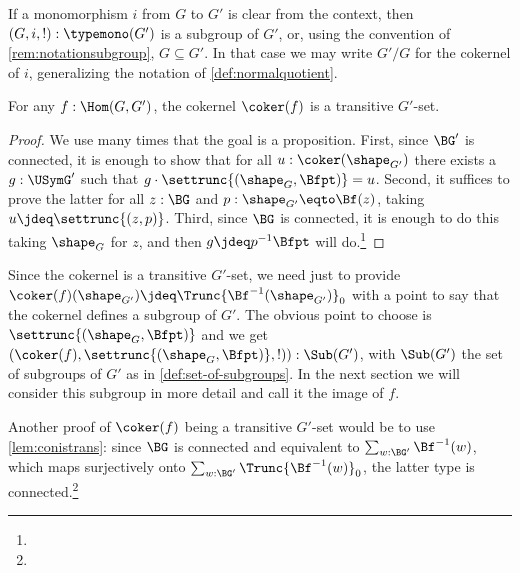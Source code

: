 If a monomorphism $i$ from $G$ to $G'$ is clear from the context,
then $(G,i,!):\typemono(G')$ is a subgroup of $G'$, 
or, using the convention of \cref{rem:notationsubgroup}, $G\subseteq G'$. 
In that case we may write $G'/G$ for the cokernel of $i$,
generalizing the notation of \cref{def:normalquotient}.
\begin{lemma}
  \label{lem:isTrans(coker)}
  For any $f:\Hom(G,G')$, the cokernel $\coker(f)$ is a transitive $G'$-set.
\end{lemma}
\begin{proof}
We use many times that the goal is a proposition.
First, since $\BG'$ is connected, it is enough to show that for all 
$u:\coker(\sh_{G'})$ there exists
a $g:\USymG'$ such that $g\cdot\settrunc{(\sh_G,\Bfpt)}=u$.
Second, it suffices to prove the latter for all $z:\BG$ and 
$p:\sh_{G'}\eqto\Bf(z)$, taking $u\jdeq\settrunc{(z,p)}$.  
Third, since $\BG$ is connected, it is enough to do this taking $\sh_G$ 
for $z$, and then $g\jdeq p^{-1} \Bfpt$ will do.\footnote{%
 }
\end{proof}   
\begin{remark}
  \label{rem:imageandcokernel}
  Since the cokernel is a transitive $G'$-set, we need just to 
  provide $\coker(f)(\sh_{G'})\jdeq\Trunc{\Bf^{-1}(\sh_{G'})}_0$ 
  with a point to say that the cokernel defines a subgroup of $G'$. 
  The obvious point to choose is $\settrunc{(\sh_G,\Bfpt)}$ and
  we get $(\coker(f),\settrunc{(\sh_G,\Bfpt)},!)):\Sub(G')$, with 
  $\Sub(G')$ the set of subgroups of $G'$ as in \cref{def:set-of-subgroups}.
  In the next section we will consider this subgroup in more 
  detail and call it the image of $f$.

Another proof of $\coker(f)$ being a transitive $G'$-set would be 
to use \cref{lem:conistrans}: since $\BG$ is connected and equivalent to 
$\sum_{w:\BG'}\Bf^{-1}(w)$, which maps surjectively onto 
$\sum_{w:\BG'}\Trunc{\Bf^{-1}(w)}_0$, the latter type is connected.\footnote{%
}
\end{remark}


